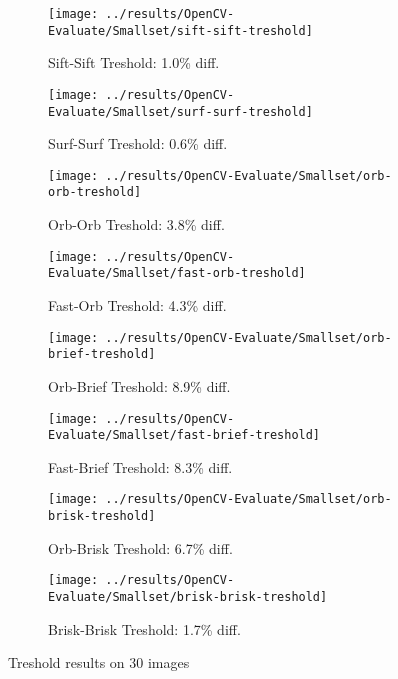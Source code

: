 \documentclass{article}
\begin{document}
\begin{figure}
        \centering
		\begin{subfigure}[b]{0.45\textwidth}
                \centering
				\texttt{[image: ../results/OpenCV-Evaluate/Smallset/sift-sift-treshold]}
				\caption{Sift-Sift Treshold: 1.0\% diff.}
				\label{fig:smallset-sift-sift-treshold}
        \end{subfigure}%
		\quad %
		\begin{subfigure}[b]{0.45\textwidth}
                \centering
				\texttt{[image: ../results/OpenCV-Evaluate/Smallset/surf-surf-treshold]}
				\caption{Surf-Surf Treshold: 0.6\% diff.}
				\label{fig:smallset-surf-surf-treshold}
        \end{subfigure}%


		\begin{subfigure}[b]{0.45\textwidth}
                \centering
				\texttt{[image: ../results/OpenCV-Evaluate/Smallset/orb-orb-treshold]}
				\caption{Orb-Orb Treshold: 3.8\% diff.}
				\label{fig:smallset-orb-orb-treshold}
        \end{subfigure}%
		\quad%
		\begin{subfigure}[b]{0.45\textwidth}
                \centering
				\texttt{[image: ../results/OpenCV-Evaluate/Smallset/fast-orb-treshold]}
				\caption{Fast-Orb Treshold: 4.3\% diff.}
				\label{fig:smallset-fast-orb-treshold}
        \end{subfigure}%

		\begin{subfigure}[b]{0.45\textwidth}
                \centering
				\texttt{[image: ../results/OpenCV-Evaluate/Smallset/orb-brief-treshold]}
				\caption{Orb-Brief Treshold: 8.9\% diff.}
				\label{fig:smallset-orb-brief-treshold}
        \end{subfigure}%
		\quad%
		\begin{subfigure}[b]{0.45\textwidth}
                \centering
				\texttt{[image: ../results/OpenCV-Evaluate/Smallset/fast-brief-treshold]}
				\caption{Fast-Brief Treshold: 8.3\% diff.}
				\label{fig:smallset-fast-brief-treshold}
        \end{subfigure}%

		\begin{subfigure}[b]{0.45\textwidth}
                \centering
				\texttt{[image: ../results/OpenCV-Evaluate/Smallset/orb-brisk-treshold]}
				\caption{Orb-Brisk Treshold: 6.7\% diff.}
				\label{fig:smallset-orb-brisk-treshold}
        \end{subfigure}%
		\quad%
		\begin{subfigure}[b]{0.45\textwidth}
                \centering
				\texttt{[image: ../results/OpenCV-Evaluate/Smallset/brisk-brisk-treshold]}
				\caption{Brisk-Brisk Treshold: 1.7\% diff.}
				\label{fig:smallset-brisk-brisk-treshold}
        \end{subfigure}%
		\caption{Treshold results on 30 images}\label{fig:smallset-all-methods}
\end{figure}
\end{document}
